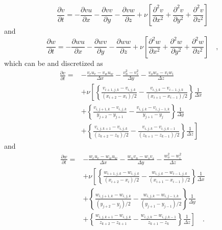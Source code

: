 \documentclass[12pt,a4paper,fleqn]{article}
\begin{document}
\begin{equation} \label{eq:3D-convective-diffusive-v}
\frac{\partial v}{\partial t} = -\frac{\partial vu}{\partial x} -\frac{\partial vv}{\partial y} -\frac{\partial vw}{\partial z} + \nu\left[\frac{\partial^2v}{\partial x^2} + \frac{\partial^2v}{\partial y^2} + \frac{\partial^2v}{\partial z^2}\right]
\end{equation}
and 
\begin{equation} \label{eq:3D-convective-diffusive-w}
\frac{\partial w}{\partial t} = -\frac{\partial wu}{\partial x} -\frac{\partial wv}{\partial y} -\frac{\partial ww}{\partial z} + \nu\left[\frac{\partial^2w}{\partial x^2} + \frac{\partial^2w}{\partial y^2} + \frac{\partial^2w}{\partial z^2}\right] \quad,
\end{equation}
which can be and discretized as
\begin{align}\label{eq:3D-discretized_convective-diffusive-v}
\frac{\partial v}{\partial t} =
{}& - \frac{v_e u_e - v_w u_w}{\Delta x} - \frac{v_n^2 - v_s^2}{\Delta y} - \frac{v_o w_o - v_i w_i}{\Delta z}\\
& + \nu\left[
\left\{
\frac{v_{i+1,j,k} - v_{i,j,k}}{(x_{i+2}-x_{i})/2}
- \frac{v_{i,j,k} - v_{i-1,j,k}}{(x_{i+1}-x_{i-1})/2}
\right\}
\frac{1}{\Delta x}
\right.\nonumber\\
& + \left\{
\frac{v_{i,j+1,k} - v_{i,j,k}}{y_{j+2}-y_{j+1}}
- \frac{v_{i,j,k} - v_{i,j-1,k}}{y_{j+1}-y_j}
\right\}
\frac{1}{\Delta y}
\nonumber\\
& \left. + \left\{
\frac{v_{i,j,k+1} - v_{i,j,k}}{(z_{k+2}-z_k)/2}
- \frac{v_{i,j,k} - v_{i,j,k-1}}{(z_{k+1}-z_{k-1})/2}
\right\}
\frac{1}{\Delta z}
\right] \quad
\end{align}
and
\begin{align}\label{eq:3D-discretized_convective-diffusive-w}
\frac{\partial w}{\partial t} =
{}& - \frac{w_e u_e - w_w u_w}{\Delta x} - \frac{w_n v_n - w_s v_s}{\Delta y} - \frac{w_o^2 - w_i^2}{\Delta z}\\
& + \nu\left[
\left\{
\frac{w_{i+1,j,k} - w_{i,j,k}}{(x_{i+2}-x_{i})/2}
- \frac{w_{i,j,k} - w_{i-1,j,k}}{(x_{i+1}-x_{i-1})/2}
\right\}
\frac{1}{\Delta x}
\right.\nonumber\\
& + \left\{
\frac{w_{i,j+1,k} - w_{i,j,k}}{(y_{j+2}-y_j)/2}
- \frac{w_{i,j,k} - w_{i,j-1,k}}{(y_{j+1}-y_{j-1})/2}
\right\}
\frac{1}{\Delta y}
\nonumber\\
& \left. + \left\{
\frac{w_{i,j,k+1} - w_{i,j,k}}{z_{k+2}-z_{k+1}}
- \frac{w_{i,j,k} - w_{i,j,k-1}}{z_{k+1}-z_k}
\right\}
\frac{1}{\Delta z}
\right] \quad.
\end{align}
\end{document}

